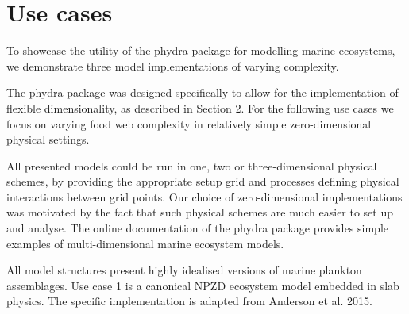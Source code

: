 \documentclass[journal abbreviation, manuscript]{copernicus}
\begin{document}
\section{Use cases}

To showcase the utility of the phydra package for modelling marine ecosystems, we demonstrate three model implementations of varying complexity.

The phydra package was designed specifically to allow for the implementation of flexible dimensionality, as described in Section 2. For the following use cases we focus on varying food web complexity in relatively simple zero-dimensional physical settings. 

All presented models could be run in one, two or three-dimensional physical schemes, by providing the appropriate setup grid and processes defining physical interactions between grid points. Our choice of zero-dimensional implementations was motivated by the fact that such physical schemes are much easier to set up and analyse.  The online documentation of the phydra package provides simple examples of multi-dimensional marine ecosystem models.

All model structures present highly idealised versions of marine plankton assemblages. Use case 1 is a canonical NPZD ecosystem model embedded in slab physics. The specific implementation is adapted from Anderson et al. 2015. 
\end{document}
